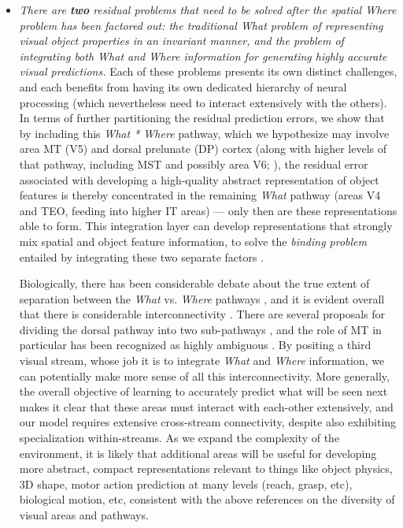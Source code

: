 \documentclass[11pt,twoside]{article}
\newif\myifpdf
\begin{document}
\begin{itemize}
\item \emph{There are \textbf{two} residual problems that need to be solved after the  spatial \emph{Where} problem has been factored out: the traditional \emph{What} problem of representing visual object properties in an invariant manner, and the problem of integrating both \emph{What} and \emph{Where} information for generating highly accurate visual predictions.}  Each of these problems presents its own distinct challenges, and each  benefits from having its own dedicated hierarchy of neural processing (which nevertheless need to interact extensively with the others).  In terms of further partitioning the residual prediction errors, we show that by including this \emph{What * Where} pathway, which we hypothesize may involve area MT (V5) and dorsal prelunate (DP) cortex (along with higher levels of that pathway, including MST and possibly area V6; ), the residual error associated with developing a high-quality abstract representation of object features is thereby concentrated in the remaining \emph{What} pathway (areas V4 and TEO, feeding into higher IT areas) --- only then are these representations able to form.  This integration layer can develop representations that strongly mix spatial and object feature information, to solve the {\em binding problem} entailed by integrating these two separate factors \cite{OReillyBusbySoto03,CerOReilly06}.

Biologically, there has been considerable debate about the true extent of separation between the {\em What} vs. {\em Where} pathways \cite{FreudPlautBehrmann16,deHaanCowey11,SchenkMcIntosh10,SerenoMaunsell98,HongYaminsMajajEtAl16,ZoccolanKouhPoggioEtAl07}, and it is evident overall that there is considerable interconnectivity .  There are several proposals for dividing the dorsal pathway into two sub-pathways \cite{RizzolattiMatelli03,KravitzSaleemBakerEtAl11,HaakBeckmann17}, and the role of MT in particular has been recognized as highly ambiguous \cite{MilnerGoodale06}. By positing a third visual stream, whose job it is to integrate {\em What} and {\em Where} information, we can potentially make more sense of all this interconnectivity.  More generally, the overall objective of learning to accurately predict what will be seen next makes it clear that these areas must interact with each-other extensively, and our model requires extensive cross-stream connectivity, despite also exhibiting specialization within-streams.  As we expand the complexity of the environment, it is likely that additional areas will be useful for developing more abstract, compact representations relevant to things like object physics, 3D shape, motor action prediction at many levels (reach, grasp, etc), biological motion, etc, consistent with the above references on the diversity of visual areas and pathways.


\end{itemize}
\end{document}
